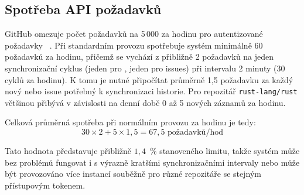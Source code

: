 \subsection{Spotřeba API požadavků}
\label{sec:evaluace:benchmarks:api}

GitHub omezuje počet \API požadavků na 5\,000 za hodinu pro autentizované požadavky~\cite{github_rate_limits} .
Při standardním provozu spotřebuje systém minimálně 60 požadavků za hodinu, přičemž se vychází z přibližně 2 požadavků na jeden synchronizační cyklus (jeden pro \PR, jeden pro issues) při intervalu 2 minuty (30 cyklů za hodinu).
K tomu je nutné připočítat průměrně 1,5 požadavku za každý nový \PR nebo issue potřebný k synchronizaci historie.
Pro repozitář \texttt{rust-lang/rust} většinou přibývá v závislosti na denní době 0 až 5 nových záznamů za hodinu.

Celková průměrná spotřeba při normálním provozu za hodinu je tedy:
\[
  30 \times 2 + 5 \times 1{,}5 = 67{,}5 \text{ požadavků/hod}
\]

Tato hodnota představuje přibližně $1{,}4$~\% stanoveného limitu, takže systém může bez problémů fungovat i s výrazně kratšími synchronizačními intervaly nebo může být provozováno více instancí souběžně pro různé repozitáře se stejným přístupovým tokenem.
